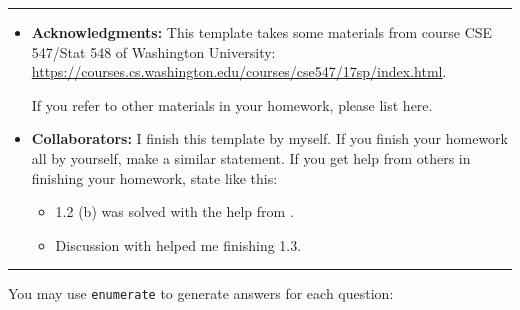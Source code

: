 \documentclass[a4paper]{article}
\begin{document}
\courseheader
{}
\rule{\textwidth}{1pt}
\begin{itemize}
\item {\bf Acknowledgments: \/} 
  This template takes some materials from course CSE 547/Stat 548 of Washington University: \small{\url{https://courses.cs.washington.edu/courses/cse547/17sp/index.html}}.

  If you refer to other materials in your homework, please list here.
\item {\bf Collaborators: \/}
  I finish this template by myself. If you finish your homework all by yourself, make a similar statement. If you get help from others in finishing your homework, state like this:
  \begin{itemize}
  \item 1.2 (b) was solved with the help from \underline{\hspace{3em}}.
  \item Discussion with \underline{\hspace{3em}} helped me finishing 1.3.
  \end{itemize}
\end{itemize}
\rule{\textwidth}{1pt}

\vspace{2em}

You may use \texttt{enumerate} to generate answers for each question:
\end{document}
